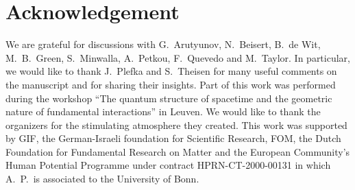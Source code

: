 \documentclass[12pt]{article}
\numberwithin{equation}{section} \setlength{\textwidth}{17cm}
\begin{document}
\vskip1cm
\section*{Acknowledgement}
We are grateful for discussions with G.~Arutyunov, N.~Beisert, B.~de Wit, M.~B.~Green, S.~Minwalla, 
A.~Petkou, F.~Quevedo and M.~Taylor. In particular, we would like to thank J.~Plefka and 
S.~Theisen for many useful comments on the manuscript and for sharing their insights. 
Part of this work was performed during the workshop ``The quantum structure of 
spacetime and the geometric nature of fundamental interactions'' in Leuven. We would like to thank the organizers 
for the stimulating atmosphere they created. 
This work was supported by GIF, the German-Israeli foundation
for Scientific Research, FOM, the Dutch Foundation for Fundamental Research on Matter and 
the European Community's Human Potential Programme under contract HPRN-CT-2000-00131 
in which A.~P.~is associated to the University of Bonn.  
\appendix
\end{document}
